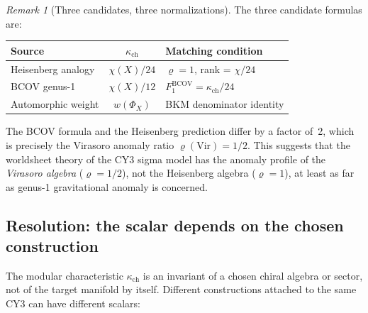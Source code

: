 \documentclass[11pt]{article}
\theoremstyle{definition}
\theoremstyle{remark}
\newtheorem{remark}[theorem]{Remark}
\begin{document}
\begin{remark}[Three candidates, three normalizations]
The three candidate formulas are:
\begin{center}
\begin{tabular}{lcl}
\textbf{Source} & $\kappa_{\mathrm{ch}}$ & \textbf{Matching condition} \\ \hline
Heisenberg analogy & $\chi(X)/24$ & $\varrho = 1$, rank = $\chi/24$ \\
BCOV genus-1 & $\chi(X)/12$ & $F_1^{\mathrm{BCOV}} = \kappa_{\mathrm{ch}}/24$ \\
Automorphic weight & $w(\Phi_X)$ & BKM denominator identity
\end{tabular}
\end{center}
The BCOV formula and the Heisenberg prediction differ by a factor of~2,
which is precisely the Virasoro anomaly ratio $\varrho(\mathrm{Vir}) = 1/2$.
This suggests that the worldsheet theory of the CY3 sigma model has the
anomaly profile of the \emph{Virasoro algebra} ($\varrho = 1/2$), not
the Heisenberg algebra ($\varrho = 1$), at least as far as genus-1
gravitational anomaly is concerned.
\end{remark}

\subsection{Resolution: the scalar depends on the chosen construction}

The modular characteristic $\kappa_{\mathrm{ch}}$ is an invariant of a
chosen chiral algebra or sector, not of the target manifold by itself.
Different constructions attached to the same CY3 can have different
scalars:
\end{document}
